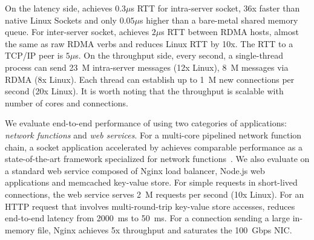 On the latency side, \sys{} achieves $0.3\mu$s RTT for intra-server socket, 36x faster than native Linux Sockets and only $0.05\mu$s higher than a bare-metal shared memory queue. For inter-server socket, \sys{} achieves $2\mu$s RTT between RDMA hosts, almost the same as raw RDMA verbs and reduces Linux RTT by 10x. The RTT to a TCP/IP peer is $5\mu$s. On the throughput side, every second, a single-thread process can send 23~M intra-server messages (12x Linux), 8~M messages via RDMA (8x Linux).
Each thread can establish up to 1~M new connections per second (20x Linux). It is worth noting that the throughput is scalable with number of cores and connections.

We evaluate end-to-end performance of \sys{} using two categories of applications: \textit{network functions} and \textit{web services}. For a multi-core pipelined network function chain, a socket application accelerated by \sys{} achieves comparable performance as a state-of-the-art framework specialized for network functions~\cite{panda2016netbricks}. We also evaluate \sys{} on a standard web service composed of Nginx load balancer, Node.js web applications and memcached key-value store. For simple requests in short-lived connections, the web service serves 2~M requests per second (10x Linux). For an HTTP request that involves multi-round-trip key-value store accesses, \sys{} reduces end-to-end latency from 2000~ms to 50~ms. For a connection sending a large in-memory file, Nginx achieves 5x throughput and saturates the 100~Gbps NIC.

